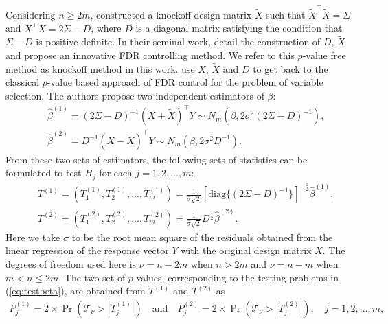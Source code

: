 \documentclass[11pt]{article}
\numberwithin{equation}{section}
\theoremstyle{plain}
\theoremstyle{remark}
\begin{document}
Considering $n\geq 2m$, \citet{barber2015controlling} constructed a knockoff design matrix $\tilde{X}$ such that $\tilde{X}^\top \tilde{X}=\Sigma$ and $X^\top\tilde{X}=2\Sigma-D$, where $D$ is a diagonal matrix satisfying the condition that $\Sigma-D$ is positive definite. In their seminal work, \citet{barber2015controlling} detail the construction of $D$, $\tilde{X}$ and propose an innovative FDR controlling method. We refer to this $p$-value free method as knockoff method in this work. \citet{sarkar2022adjusting} use $X$, $\tilde{X}$ and $D$ to get back to the classical $p$-value based approach of FDR control for the problem of variable selection. The authors propose two independent estimators of $\beta$:
\begin{eqnarray*}
    & &\hat{\beta}^{(1)}=(2\Sigma-D)^{-1} (X+\tilde{X})^\top Y\sim N_m(\beta,2\sigma^2(2\Sigma-D)^{-1}),\\
    & &\hat{\beta}^{(2)}=D^{-1} (X-\tilde{X})^\top Y\sim N_m(\beta,2\sigma^2 D^{-1}).
\end{eqnarray*}
From these two sets of estimators, the following sets of statistics can be formulated to test $H_j$ for each $j=1,2,...,m$:
\begin{eqnarray*}
    & & T^{(1)}=(T^{(1)}_1,T^{(1)}_2, ..., T^{(1)}_m)=\frac{1}{\hat{\sigma}\sqrt{2}}[\textrm{diag}\{(2\Sigma-D)^{-1}\}]^{-\frac{1}{2}} \hat{\beta}^{(1)},\\
    & & T^{(2)}=(T^{(2)}_1,T^{(2)}_2, ..., T^{(2)}_m)=\frac{1}{\hat{\sigma}\sqrt{2}} D^{\frac{1}{2}}\hat{\beta}^{(2)}.
\end{eqnarray*}
Here we take $\hat{\sigma}$ to be the root mean square of the residuals obtained from the linear regression of the response vector $Y$ with the original design matrix $X$. The degrees of freedom used here is $\nu=n-2m$ when $n>2m$ and $\nu=n-m$ when $m<n\leq 2m$. The two set of $p$-values, corresponding to the testing problems in (\ref{eq:testbeta}), are obtained from $T^{(1)}$ and $T^{(2)}$ as
\begin{eqnarray*}
    P^{(1)}_j=2\times \Pr(\mathcal{T}_\nu> |T^{(1)}_j|)\quad \textrm{and}\quad P^{(2)}_j=2\times \Pr(\mathcal{T}_\nu> |T^{(2)}_j|),\quad j=1,2,...,m,
\end{eqnarray*}
\end{document}
